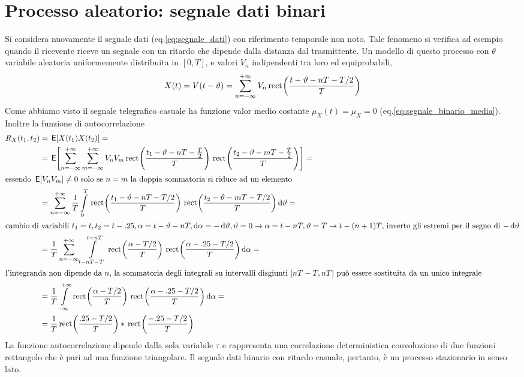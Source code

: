 \section[Processo aleatorio con riferimento temporale aleatorio]{Processo aleatorio: segnale dati binari}
Si considera nuovamente il segnale dati (eq.\ref{eq:segnale_dati}) con riferimento temporale non noto. Tale fenomeno si verifica ad esempio quando il ricevente riceve un segnale con un ritardo che dipende dalla distanza dal trasmittente. Un modello di questo processo con $\theta$ variabile aleatoria uniformemente distribuita in $[0,T]$, e valori $V_n$ indipendenti tra loro ed equiprobabili,
\[X(t)=V(t-\vartheta)=\sum_{n=-\infty}^{+\infty}V_n\,{\operatorname{rect}}^{}\!\left({\frac{t-\vartheta-n T-T/2}{T}}\right)\]
Come abbiamo visto il segnale telegrafico casuale ha funzione valor medio costante $\mu_X(t)=\mu_X=0$ (eq.\ref{eq:segnale_binario_media}).
Inoltre la funzione di autocorrelazione 
\[\begin{split}R_X(t_1,t_2)&=\E{X(t_1)X(t_2)}=\\
&=\E{\sum_{n=-\infty}^{+\infty}\sum_{m=-\infty}^{+\infty}V_n V_m\rect{\frac{t_1-\theta-n T-\frac{T}{2}}{T}}\rect{\frac{t_2-\theta-m T-\frac{T}{2}}{T}}}=\\
\intertext{essendo $\E{V_nV_m}\neq 0$ solo se $n=m$ la doppia sommatoria si riduce ad un elemento}
&=\sum_{n=-\infty}^{+\infty}\frac{1}{T}\intd{0}{T}{\rect{\frac{t_1-\theta-n T-T/2}{T}}\rect{\frac{t_2-\theta-m T-T/2}{T}}}{\theta}=\\
\intertext{cambio di variabili $t_1=t, t_2=t-\tau, \alpha=t-\theta-n T,\diff\alpha=-\diff\theta, \theta=0\to\alpha=t-nT, \theta=T\to t-(n+1)T$, inverto gli estremi per il segno di $-\diff\theta$}
&=\frac{1}{T}\sum_{n=-\infty}^{+\infty}\intd{t-n T-T}{t-n T}{\rect{\frac{\alpha-T/2}{T}}\rect{\frac{\alpha-\tau-T/2}{T}}}{\alpha}=\\
\intertext{l'integranda non dipende da $n$, la sommatoria degli integrali su intervalli disgiunti $[n T-T,n T]$ può essere sostituita da un unico integrale}
&=\frac{1}{T}\intd{-\infty}{+\infty}{\rect{\frac{\alpha-T/2}{T}}\rect{\frac{\alpha-\tau-T/2}{T}}}{\alpha}=\\
&=\frac{1}{T}\rect{\frac{\tau-T/2}{T}}\ast\rect{\frac{-\tau-T/2}{T}}
\end{split}\]
La funzione autocorrelazione dipende dalla sola variabile $\tau$ e rappresenta una correlazione deterministica convoluzione di due funzioni rettangolo che è pari ad una funzione triangolare.
Il segnale dati binario con ritardo casuale, pertanto, è un processo stazionario in senso lato.

